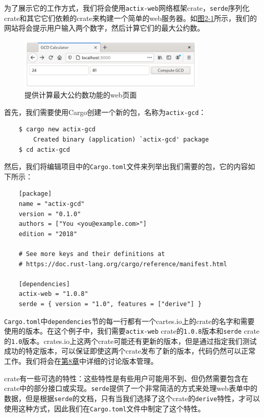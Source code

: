 为了展示它的工作方式，我们将会使用\texttt{actix-web}网络框架crate，\texttt{serde}序列化crate和其它它们依赖的crate来构建一个简单的web服务器。如\hyperref[f2-1]{图2-1}所示，我们的网站将会提示用户输入两个数字，然后计算它们的最大公约数。
\begin{figure}[htbp]
    \centering
    \includegraphics[width=0.8\textwidth]{../img/f2-1.png}
    \caption{提供计算最大公约数功能的web页面}
    \label{f2-1}
\end{figure}

首先，我们需要使用Cargo创建一个新的包，名称为\texttt{actix-gcd}：
\begin{verbatim}
    $ cargo new actix-gcd
        Created binary (application) `actix-gcd' package
    $ cd actix-gcd
\end{verbatim}

然后，我们将编辑项目中的\texttt{Cargo.toml}文件来列举出我们需要的包，它的内容如下所示：
\begin{verbatim}
    [package]
    name = "actix-gcd"
    version = "0.1.0"
    authors = ["You <you@example.com>"]
    edition = "2018"

    # See more keys and their definitions at
    # https://doc.rust-lang.org/cargo/reference/manifest.html

    [dependencies]
    actix-web = "1.0.8"
    serde = { version = "1.0", features = ["derive"] }
\end{verbatim}

\texttt{Cargo.toml}中\texttt{dependencies}节的每一行都有一个cartes.io上的crate的名字和需要使用的版本。在这个例子中，我们需要\texttt{actix-web} crate的\texttt{1.0.8}版本和\texttt{serde} crate的\texttt{1.0}版本。crates.io上这两个crate可能还有更新的版本，但是通过指定我们测试成功的特定版本，可以保证即使这两个crate发布了新的版本，代码仍然可以正常工作。我们将会在\hyperref[ch08]{第8章}中详细的讨论版本管理。

crate有一些可选的特性：这些特性是有些用户可能用不到、但仍然需要包含在crate中的部分接口或实现。\texttt{serde}提供了一个非常简洁的方式来处理web表单中的数据，但是根据\texttt{serde}的文档，只有当我们选择了这个crate的\texttt{derive}特性，才可以使用这种方式，因此我们在\texttt{Cargo.toml}文件中制定了这个特性。

